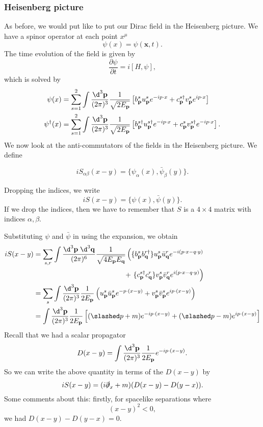 \documentclass[a4paper]{article}
\begin{document}
\subsubsection*{Heisenberg picture}
As before, we would put like to put our Dirac field in the Heisenberg picture. We have a spinor operator at each point $x^\mu$
\[
  \psi(x) = \psi(\mathbf{x}, t).
\]
The time evolution of the field is given by
\[
  \frac{\partial \psi}{\partial t} = i [H, \psi],
\]
which is solved by
\begin{align*}
  \psi(x) &= \sum_{s = 1}^2 \int \frac{\d^3 \mathbf{p}}{(2\pi)^3} \frac{1}{\sqrt{2E_\mathbf{p}}} \left[b_\mathbf{p}^s u_\mathbf{p}^s e^{-ip\cdot x} + c_\mathbf{p}^{s\dagger}v_\mathbf{p}^s e^{ip\cdot x}\right]\\
  \psi^\dagger(x) &= \sum_{s = 1}^2 \int \frac{\d^3 \mathbf{p}}{(2\pi)^3} \frac{1}{\sqrt{2E_\mathbf{p}}} \left[b_\mathbf{p}^{s\dagger} u_\mathbf{p}^{s\dagger} e^{-ip\cdot x} + c_\mathbf{p}^{s}v_\mathbf{p}^{s\dagger} e^{-ip\cdot x}\right].
\end{align*}
We now look at the anti-commutators of the fields in the Heisenberg picture. We define
\begin{defi}
  \[
    i S_{\alpha\beta}(x - y) = \{\psi_\alpha(x), \bar\psi_\beta(y)\}.
  \]
\end{defi}
Dropping the indices, we write
\[
  i S(x - y) = \{\psi(x), \bar\psi(y)\}.
\]
If we drop the indices, then we have to remember that $S$ is a $4 \times 4$ matrix with indices $\alpha, \beta$.

Substituting $\psi$ and $\bar\psi$ in using the expansion, we obtain
\begin{align*}
  iS(x - y) &= \sum_{s, r} \int \frac{\d^3 \mathbf{p}\; \d^3 \mathbf{q}}{(2\pi)^6} \frac{1}{\sqrt{4E_\mathbf{p} E_\mathbf{q}}} \left(\{b_\mathbf{p}^s b_\mathbf{q}^{r\dagger}\} u_\mathbf{p}^s \bar u_\mathbf{q}^r e^{-i(p\cdot x - q \cdot y)}\right.\\
  &\hphantom{=\sum_{s, r} \int \frac{\d^3 \mathbf{p}\; \d^3 \mathbf{q}}{(2\pi)^6} \frac{1}{\sqrt{4E_\mathbf{p} E_\mathbf{q}}} } +\left.\{c_\mathbf{p}^{s\dagger}c_\mathbf{q}^r \} v_\mathbf{p}^s \bar v_\mathbf{q}^r e^{i(p\cdot x - q \cdot y)}\right)\\
  &= \sum_s \int \frac{\d^3 \mathbf{p}}{(2\pi)^3} \frac{1}{2 E_\mathbf{p}} \left(u_\mathbf{p}^s \bar u_\mathbf{p}^s e^{-p\cdot(x - y)} + v_\mathbf{p}^s \bar v_\mathbf{p}^s e^{ip\cdot(x - y)}\right)\\
  &= \int \frac{\d^3 \mathbf{p}}{(2\pi)^3} \frac{1}{2 E_\mathbf{p}} \left[(\slashed p + m) e^{-ip\cdot (x - y)} + (\slashed p - m) e^{i p\cdot (x - y)}\right]
\end{align*}
Recall that we had a scalar propagator
\[
  D(x - y) = \int \frac{\d^3 \mathbf{p}}{(2\pi)^3} \frac{1}{2 E_\mathbf{p}} e^{-ip\cdot (x - y)}.
\]
So we can write the above quantity in terms of the $D(x - y)$ by
\[
  iS(x - y) = (i \slashed \partial_x + m)(D(x - y) - D(y - x)).
\]
Some comments about this: firstly, for spacelike separations where
\[
  (x - y)^2 < 0,
\]
we had $D(x - y) - D(y - x) = 0$.
\end{document}
